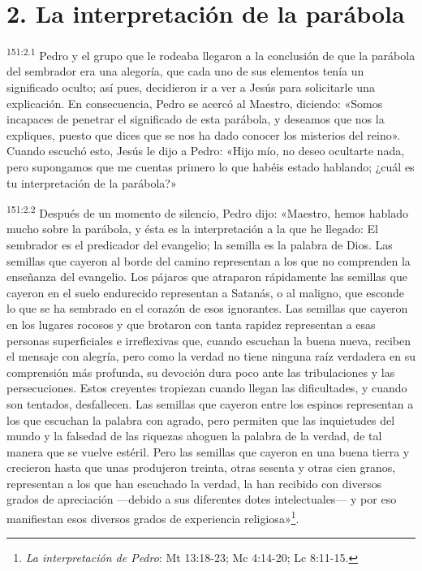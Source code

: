 \section*{2. La interpretación de la parábola}
\par 
\textsuperscript{151:2.1} Pedro y el grupo que le rodeaba llegaron a la conclusión de que la parábola del sembrador era una alegoría, que cada uno de sus elementos tenía un significado oculto; así pues, decidieron ir a ver a Jesús para solicitarle una explicación. En consecuencia, Pedro se acercó al Maestro, diciendo: «Somos incapaces de penetrar el significado de esta parábola, y deseamos que nos la expliques, puesto que dices que se nos ha dado conocer los misterios del reino». Cuando escuchó esto, Jesús le dijo a Pedro: «Hijo mío, no deseo ocultarte nada, pero supongamos que me cuentas primero lo que habéis estado hablando; ¿cuál es tu interpretación de la parábola?»

\par 
\textsuperscript{151:2.2} Después de un momento de silencio, Pedro dijo: «Maestro, hemos hablado mucho sobre la parábola, y ésta es la interpretación a la que he llegado: El sembrador es el predicador del evangelio; la semilla es la palabra de Dios. Las semillas que cayeron al borde del camino representan a los que no comprenden la enseñanza del evangelio. Los pájaros que atraparon rápidamente las semillas que cayeron en el suelo endurecido representan a Satanás, o al maligno, que esconde lo que se ha sembrado en el corazón de esos ignorantes. Las semillas que cayeron en los lugares rocosos y que brotaron con tanta rapidez representan a esas personas superficiales e irreflexivas que, cuando escuchan la buena nueva, reciben el mensaje con alegría, pero como la verdad no tiene ninguna raíz verdadera en su comprensión más profunda, su devoción dura poco ante las tribulaciones y las persecuciones. Estos creyentes tropiezan cuando llegan las dificultades, y cuando son tentados, desfallecen. Las semillas que cayeron entre los espinos representan a los que escuchan la palabra con agrado, pero permiten que las inquietudes del mundo y la falsedad de las riquezas ahoguen la palabra de la verdad, de tal manera que se vuelve estéril. Pero las semillas que cayeron en una buena tierra y crecieron hasta que unas produjeron treinta, otras sesenta y otras cien granos, representan a los que han escuchado la verdad, la han recibido con diversos grados de apreciación ---debido a sus diferentes dotes intelectuales--- y por eso manifiestan esos diversos grados de experiencia religiosa»\footnote{\textit{La interpretación de Pedro}: Mt 13:18-23; Mc 4:14-20; Lc 8:11-15.}.

